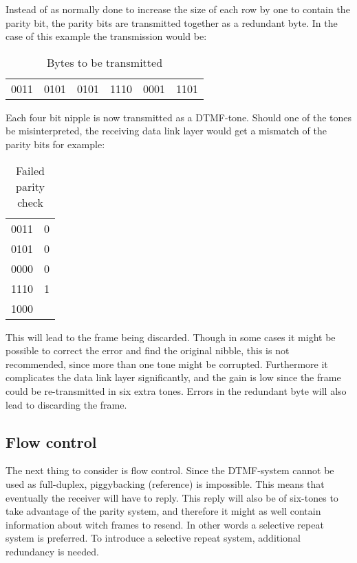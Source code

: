 Instead of as normally done to increase the size of each row by one to contain
the parity bit, the parity bits are transmitted together as a redundant byte. In
the case of this example the transmission would be:

\begin{table}[htb]
	\centering
	\begin{tabular}{c|c|c|c|c|c}
	0011 & 0101 & 0101 & 1110 & 0001 & 1101 \\
	\end{tabular}
	\caption{Bytes to be transmitted}
	\label{tab:bytes_to_be_transmitted}
\end{table}

Each four bit nipple is now transmitted as a DTMF-tone. Should one of the tones
be misinterpreted, the receiving data link layer would get a mismatch of the
parity bits for example:

\begin{table}[htb]
	\centering
	\begin{tabular}{c|c}
	0011 & 0 \\
	0101 & 0 \\
	0000 & 0 \\
	1110 & 1 \\
	\hline
	1000 & \\
	\end{tabular}
	\caption{Failed parity check}
	\label{tab:failed_parity_check}
\end{table}

This will lead to the frame being discarded. Though in some cases it might be
possible to correct the error and find the original nibble, this is not
recommended, since more than one tone might be corrupted. Furthermore it
complicates the data link layer significantly, and the gain is low since the
frame could be re-transmitted in six extra tones. Errors in the redundant byte
will also lead to discarding the frame.

\subsection{Flow control}
The next thing to consider is flow control. Since the DTMF-system
cannot be used as full-duplex, piggybacking (reference) is impossible. This
means that eventually the receiver will have to reply. This reply will also
be of six-tones to take advantage of the parity system, and therefore it might
as well contain information about witch frames to resend. In other words a
selective repeat system is preferred. To introduce a selective repeat system,
additional redundancy is needed.

